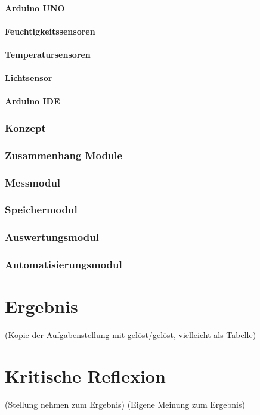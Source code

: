 \documentclass[
    load-dhbw-templates,
    load-preamble = true,
    auto-intro-pages = all,
    add-tocs-to-toc,
    debug = true,
    language = english,
    mainlanguage = ngerman,
    add-bibliography,
    bib-file = dhbw-source.bib,
    biblatex/style = alphabetic, 
]{iodhbwm}
\begin{document}
            \subsubsection{Arduino UNO}
            \subsubsection{Feuchtigkeitssensoren}
            \subsubsection{Temperatursensoren}
            \subsubsection{Lichtsensor}
            \subsubsection{Arduino IDE}
        \subsection{Konzept}
        \subsection{Zusammenhang Module}
        \subsection{Messmodul}
        \subsection{Speichermodul}
        \subsection{Auswertungsmodul}
        \subsection{Automatisierungsmodul}
    
\chapter{Ergebnis}
    (Kopie der Aufgabenstellung mit gelöst/gelöst, vielleicht als Tabelle)
    
\chapter{Kritische Reflexion}
    (Stellung nehmen zum Ergebnis)
    (Eigene Meinung zum Ergebnis)
\end{document}
